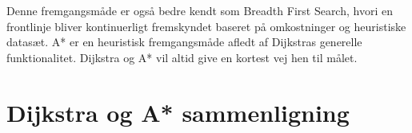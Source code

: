 Denne fremgangsmåde er også bedre kendt som Breadth First Search, hvori en frontlinje bliver kontinuerligt fremskyndet baseret på omkostninger og heuristiske datasæt\cite{stanfordredblobgamesAstar}.
A* er en heuristisk fremgangsmåde afledt af Dijkstras generelle funktionalitet. Dijkstra og A* vil altid give en kortest vej hen til målet.  %

\section{Dijkstra og A* sammenligning}